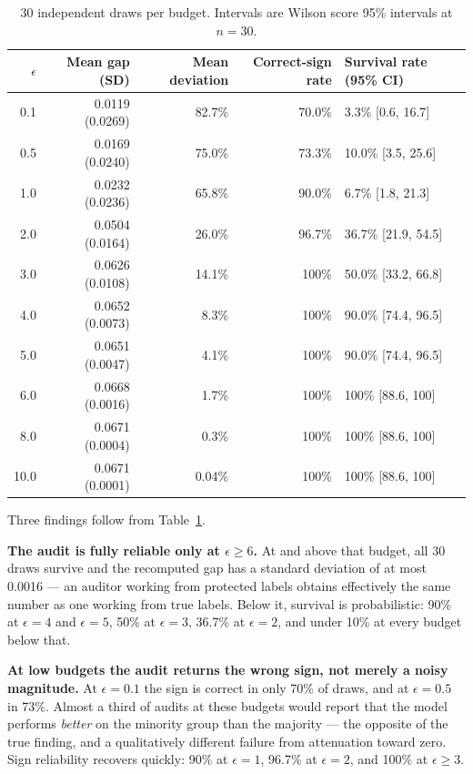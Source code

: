 \documentclass[11pt]{article}
\begin{document}
\begin{table}[H]
\centering
\begin{tabular}{rrrrl}
\toprule
$\epsilon$ & Mean gap (SD) & Mean deviation & Correct-sign rate & Survival rate (95\% CI) \\
\midrule
0.1  & 0.0119 (0.0269) & 82.7\% & 70.0\%  & 3.3\% [0.6, 16.7] \\
0.5  & 0.0169 (0.0240) & 75.0\% & 73.3\%  & 10.0\% [3.5, 25.6] \\
1.0  & 0.0232 (0.0236) & 65.8\% & 90.0\%  & 6.7\% [1.8, 21.3] \\
2.0  & 0.0504 (0.0164) & 26.0\% & 96.7\%  & 36.7\% [21.9, 54.5] \\
3.0  & 0.0626 (0.0108) & 14.1\% & 100\%   & 50.0\% [33.2, 66.8] \\
4.0  & 0.0652 (0.0073) & 8.3\%  & 100\%   & 90.0\% [74.4, 96.5] \\
5.0  & 0.0651 (0.0047) & 4.1\%  & 100\%   & 90.0\% [74.4, 96.5] \\
6.0  & 0.0668 (0.0016) & 1.7\%  & 100\%   & 100\%  [88.6, 100] \\
8.0  & 0.0671 (0.0004) & 0.3\%  & 100\%   & 100\%  [88.6, 100] \\
10.0 & 0.0671 (0.0001) & 0.04\% & 100\%   & 100\%  [88.6, 100] \\
\bottomrule
\end{tabular}
\caption{30 independent draws per budget. Intervals are Wilson score 95\% intervals at $n=30$.}
\label{tab:replication}
\end{table}

Three findings follow from Table~\ref{tab:replication}.

\textbf{The audit is fully reliable only at $\epsilon \geq 6$.} At and above that budget, all 30 draws survive and the recomputed gap has a standard deviation of at most 0.0016 --- an auditor working from protected labels obtains effectively the same number as one working from true labels. Below it, survival is probabilistic: 90\% at $\epsilon=4$ and $\epsilon=5$, 50\% at $\epsilon=3$, 36.7\% at $\epsilon=2$, and under 10\% at every budget below that.

\textbf{At low budgets the audit returns the wrong sign, not merely a noisy magnitude.} At $\epsilon=0.1$ the sign is correct in only 70\% of draws, and at $\epsilon=0.5$ in 73\%. Almost a third of audits at these budgets would report that the model performs \emph{better} on the minority group than the majority --- the opposite of the true finding, and a qualitatively different failure from attenuation toward zero. Sign reliability recovers quickly: 90\% at $\epsilon=1$, 96.7\% at $\epsilon=2$, and 100\% at $\epsilon \geq 3$.
\end{document}
